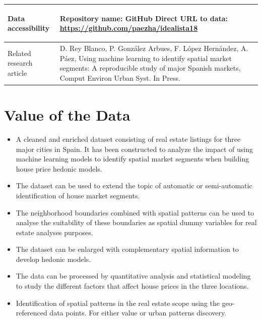 \documentclass[times,final]{elsarticle}
\begin{document}
{\begin{longtable}{|p{33mm}|p{94mm}|}
%
%
\hline
\hypertarget{target1}
{Data accessibility}   & Repository name: GitHub\newline
                         Direct URL to data: \url{https://github.com/paezha/idealista18}\newline
                         \\
\hline
Related
research\newline
article                & D. Rey Blanco, P. González Arbues, F. López Hernández, A. Páez, Using machine learning to identify spatial market segments: A reproducible study of major Spanish markets, Comput Environ Urban Syst. In Press.\newline
\end{longtable}
}

\section*{Value of the Data}

\begin{itemize}
\itemsep=0pt
\parsep=0pt
  \item A cleaned and enriched dataset consisting of real estate listings for three major cities in Spain. It has been constructed to analyze the impact of using machine learning models to identify spatial market segments when building house price hedonic models.
  \item The dataset can be used to extend the topic of automatic or semi-automatic identification of house market segments.
    \item The neighborhood boundaries combined with spatial patterns can be used to analyse the suitability of these boundaries as spatial dummy variables for real estate analyses purposes.
  \item The dataset can be enlarged with complementary spatial information to develop hedonic models.
  \item The data can be processed by quantitative analysis and statistical modeling to study the different factors that affect house prices in the three locations.
  \item Identification of spatial patterns in the real estate scope using the geo-referenced data points. For either value or urban patterns discovery.
\end{itemize}
\end{document}
